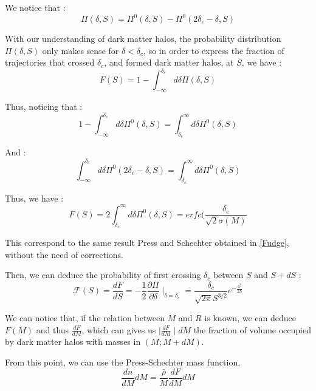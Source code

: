 We notice that :
\begin{equation}
\Pi (\delta, S) = \Pi^0(\delta,S) - \Pi^0(2\delta_c - \delta, S)
\end{equation}

With our understanding of dark matter halos, the probability distribution $\Pi(\delta, S)$ only makes sense for $\delta < \delta_c$, so in order to express the fraction of trajectories that crossed $\delta_c$, and formed dark matter halos, at $S$, we have :
\begin{equation}
\label{Frac}
F(S) = 1 - \int^{\delta_c}_{-\infty} d\delta \Pi (\delta, S)
\end{equation}

Thus, noticing that :
\begin{equation}
1 - \int^{\delta_c}_{-\infty} d\delta \Pi^0 (\delta, S) = \int_{\delta_c}^{\infty} d\delta \Pi^0 (\delta, S)
\end{equation}

And :
\begin{equation}
\int^{\delta_c}_{-\infty} d\delta \Pi^0 (2\delta_c - \delta, S) = \int_{\delta_c}^{\infty} d\delta \Pi^0 (\delta, S)
\end{equation}

Thus, we have :
\begin{equation}
\label{Frac Final}
F(S) = 2 \int_{\delta_c}^{\infty} d\delta \Pi^0 (\delta, S) = erfc(\frac{\delta_c}{\sqrt{2}\sigma(M)}
\end{equation}

This correspond to the same result Press and Schechter obtained in \ref{Fudge}, without the need of corrections.

Then, we can deduce the probability of first crossing $\delta_c$ between $S$ and $S + dS$  :
\begin{equation}
\label{Proba First Crossing}
\mathcal{F}(S) = \frac{dF}{dS} = -\frac{1}{2} \frac{\partial \Pi}{\partial \delta} \mid_{\delta = \delta_c} = \frac{\delta_c}{\sqrt{2\pi}S^{3/2}} e^{-\frac{\delta_c^2}{2S} }
\end{equation}

We can notice that, if the relation between $M$ and $R$ is known, we can deduce $F(M)$ and thus $\frac{dF}{dM}$, which can gives us $\mid \frac{dF}{dM} \mid dM$ the fraction of volume occupied by dark matter halos with masses in $(M ; M + dM)$.

From this point, we can use the Press-Schechter mass function,
\begin{equation}
\frac{dn}{dM}dM = \frac{\bar{\rho}}{M} \frac{dF}{dM} dM
\end{equation}

